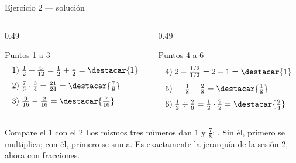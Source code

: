 \documentclass[aspectratio=169,10pt]{beamer}
\begin{document}
\begin{frame}{Ejercicio 2 — solución}
  \tiny
  \begin{columns}[T,onlytextwidth]
    \begin{column}{0.49\textwidth}
      \begin{block}{Puntos 1 a 3}
        \tiny
        \begin{align*}
          1)\;& \tfrac{1}{2} + \tfrac{6}{12}
                = \tfrac{1}{2}+\tfrac{1}{2} = \destacar{1} \\[0.3em]
          2)\;& \tfrac{7}{6}\cdot\tfrac{3}{4} = \tfrac{21}{24}
                = \destacar{\tfrac{7}{8}} \\[0.3em]
          3)\;& \tfrac{9}{16}-\tfrac{2}{16} = \destacar{\tfrac{7}{16}}
        \end{align*}
      \end{block}
    \end{column}
    \begin{column}{0.49\textwidth}
      \begin{block}{Puntos 4 a 6}
        \tiny
        \begin{align*}
          4)\;& 2 - \tfrac{1/2}{1/2} = 2 - 1 = \destacar{1} \\[0.3em]
          5)\;& -\tfrac{1}{8}+\tfrac{2}{8} = \destacar{\tfrac{1}{8}} \\[0.3em]
          6)\;& \tfrac{1}{2}\div\tfrac{2}{9}
                = \tfrac{1}{2}\cdot\tfrac{9}{2} = \destacar{\tfrac{9}{4}}
        \end{align*}
      \end{block}
    \end{column}
  \end{columns}

  \vspace{0.1cm}
  \begin{alertblock}{Compare el 1 con el 2}
    \tiny
    Los mismos tres números dan $1$ y $\tfrac{7}{8}$: . Sin él, primero se multiplica; con él, primero se
    suma. Es exactamente la jerarquía de la sesión 2, ahora con fracciones.
  \end{alertblock}
\end{frame}
\end{document}
